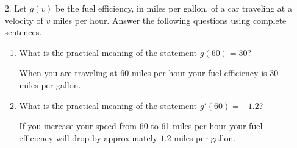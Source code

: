 \documentclass[11pt]{article}
\begin{document}
\newsavebox{\quizback}
\begin{lrbox}{\quizback}
\begin{minipage}[top][4.5in][t]{\textwidth} \setlength{\parindent}{1.5em}
\begin{enumerate}
\item[2.] Let $g(v)$ be the fuel efficiency, in miles per gallon, of a car
  traveling at a velocity of $v$ miles per hour. Answer the following
  questions using complete sentences.
  \begin{enumerate}
  \item What is the practical meaning of the statement $g(60) = 30$?

    \vfill
    
    {\color{blue} When you are traveling at 60 miles per hour your
      fuel efficiency is 30 miles per gallon.}

    \vfill
    
  \item What is the practical meaning of the statement $g'(60) = -1.2$?

    \vfill
    
    {\color{blue} If you increase your speed from 60 to 61 miles per
      hour your fuel efficiency will drop by approximately $1.2$ miles
      per gallon.}

    \vfill
    
  \end{enumerate}
\end{enumerate}
\end{minipage}
\end{lrbox}

\noindent \usebox{\quizfront}
\vfill
\noindent \usebox{\quizback}

\end{document}
